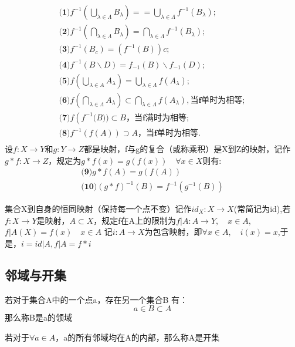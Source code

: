 \begin{theorem}
\[
\begin{array}{l}
 \textbf{(1)}  {f^{-1}\left(\bigcup_{\lambda \in \Lambda} B_{\lambda}\right)=}=\bigcup_{\lambda \in \Lambda} f^{-1}\left(B_{\lambda}\right) ; \\
\textbf{(2)} {f^{-1}\left(\bigcap_{\lambda \in \Lambda} B_{\lambda}\right)=\bigcap_{\lambda \in \Lambda} f^{-1}\left(B_{\lambda}\right) ;} \\
\textbf{(3)} f^{-1}\left(B_{c}\right)=\left(f^{-1}(B)\right) c ;\\
\textbf{(4)} f^{-1}(B \backslash D)=f_{-1}(B) \backslash f_{-1}(D) ;\\
\textbf{(5)}  f\left(\bigcup_{\lambda \in A} A_{\lambda}\right)=\bigcup_{\lambda \in \Lambda} f\left(A_{\lambda}\right) ;\\
\textbf{(6)}  f\left(\bigcap_{\lambda \in \Lambda} A_{\lambda}\right) \subset \bigcap_{\lambda \in \Lambda} f\left(A_{\lambda}\right) , \textbf{当f单时为相等} ;\\
\textbf{(7)} f\left(f^{-1}(\right.  B )  ) \subset B  ，\textbf{当f满时为相等} ;\\
\textbf{(8)}  f^{-1}(f(A)) \supset A  ，\textbf{当f单时为相等}.\\
\end{array}
\]
设\(f: X \rightarrow Y \)和\(g: Y \rightarrow Z \)都是映射，f与g的复合（或称乘积）是X到Z的映射，记作\(g*f : X \rightarrow Z \)，规定为\(g * f(x) =g(f(x)) \quad \forall x \in X \)则有: 
\[\begin{array}{l}
     \textbf{(9)} g*f(A) = g(f(A)) \\
      \textbf{(10)} (g*f)^{-1}(B)=f^{-1}(g^{-1}(B))
\end{array}\]
\end{theorem}
集合X到自身的恒同映射（保持每一个点不变）记作\(id_X : X \rightarrow X \)(常简记为id),若\(f: X \rightarrow Y\)是映射，\(A \subset X\)，规定f在A上的限制为\(f|A: A \rightarrow Y , \quad x \in A \),\(f|A(X)=f(x) \quad x \in A \) 记\(i: A \rightarrow X\)为包含映射，即\(\forall x \in A , \quad i(x)=x \),于是，\(i = id|A , f|A=f*i\) 
\subsection*{邻域与开集}
\begin{definition}
    若对于集合A中的一个点a，存在另一个集合B 有：\[a \in B \subset A\]
    那么称B是a的领域
\end{definition}
\begin{definition}
    若对于\(\forall a \in A \)，a的所有邻域均在A的内部，那么称A是开集
\end{definition}
